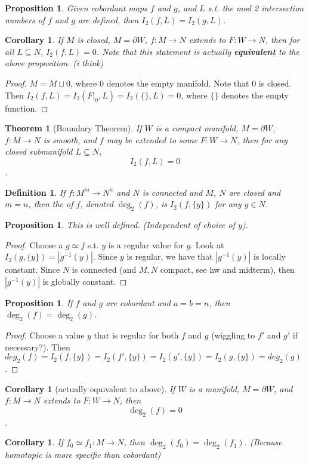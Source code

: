 \documentclass[11pt]{amsbook}
\theoremstyle{mystyle} \newtheorem{thrm}[thm]{Theorem}
\theoremstyle{mystyle} \newtheorem{defi}[thm]{Definition}
\theoremstyle{mystyle} \newtheorem{coro}[thm]{Corollary}
\theoremstyle{mystyle} \newtheorem{propo}[thm]{Proposition}
\theoremstyle{mystyle} \newtheorem{lemm}[thm]{Lemma}
\numberwithin{thm}{section}
\newcommand{\homotopic}{\simeq}
\renewcommand{\d}{\partial}
\begin{document}
\begin{propo}
	Given cobordant maps $f$ and $g$, and $L$ s.t. the mod 2 intersection numbers of $f$ and $g$ are defined, then $I_2(f, L) = I_2(g, L)$.
\end{propo}
\begin{coro}
	If $M$ is closed, $M = \d W$, $f: M \to N$ extends to $F: W \to N$, then for all $L \subseteq N$, $I_2(f, L) = 0$.  Note that this statement is actually \textbf{equivalent} to the above proposition. (i think)
\end{coro}
\begin{proof}
	$M = M \sqcup 0$, where 0 denotes the empty manifold.  Note that 0 is closed.  Then $I_2(f, L) = I_2(F|_0, L) = I_2(\{\}, L) = 0$, where $\{\}$ denotes the empty function.
\end{proof}
\begin{thrm}[Boundary Theorem]
	If $W$ is a compact manifold, $M = \d W$, $f: M \to N$ is smooth, and $f$ may be extended to some $F: W \to N$, then for any closed submanifold $L \subseteq N$, $$I_2(f, L) = 0$$.
\end{thrm}
\begin{defi}
	If $f : M^m \to N^n$ and $N$ is connected and $M$, $N$ are closed and $m=n$, then the  of $f$, denoted $\deg_2(f)$, is $I_2(f, \{y\})$ for any $y \in N$.
\end{defi}

\begin{propo}
	This is well defined.  (Independent of choice of $y$).
\end{propo}
\begin{proof}
	Choose a $g \homotopic f$ s.t. $y$ is a regular value for $g$.  Look at $I_2(g, \{y\}) = |g^{-1}(y)|$.  Since $y$ is regular, we have that $|g^{-1}(y)|$ is locally constant.  Since $N$ is connected (and $M,N$ compact, see hw and midterm), then $|g^{-1}(y)|$ is globally constant.
\end{proof}
\begin{propo}
	If $f$ and $g$ are cobordant and $a=b=n$, then \\$\deg_2(f) = \deg_2(g)$.
\end{propo}
\begin{proof}
	Choose a value $y$ that is regular for both $f$ and $g$ (wiggling to $f'$ and $g'$ if necessary?).  Then $deg_2(f) = I_2(f, \{y\}) = I_2(f', \{y\}) = I_2(g', \{y\}) = I_2(g, \{y\}) = deg_2(g)$.
\end{proof}
\begin{coro}[actually equivalent to above]
	If $W$ is a manifold, $M = \d W$, and
	$f: M \to N$
	extends to $F: W \to N$,
	then $$\deg_2(f) = 0$$.
\end{coro}
\begin{coro}
	If $f_0 \homotopic f_1: M \to N$, then $\deg_2(f_0) = \deg_2(f_1)$.  (Because homotopic is more specific than cobordant)
\end{coro}
\end{document}
